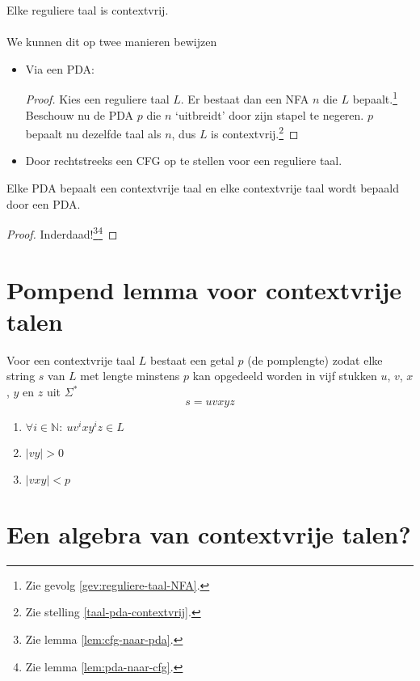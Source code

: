 \documentclass[main.tex]{subfiles}
\begin{document}
\begin{gev}
  Elke reguliere taal is contextvrij.\\\\
  We kunnen dit op twee manieren bewijzen
  \begin{itemize}
  \item Via een PDA:
    \begin{proof}
      Kies een reguliere taal $L$. Er bestaat dan een NFA $n$ die $L$ bepaalt.\footnote{Zie gevolg \ref{gev:reguliere-taal-NFA}.}
      Beschouw nu de PDA $p$ die $n$ `uitbreidt' door zijn stapel te negeren.
      $p$ bepaalt nu dezelfde taal als $n$, dus $L$ is contextvrij.\footnote{Zie stelling \ref{taal-pda-contextvrij}.}
    \end{proof}
  \item Door rechtstreeks een CFG op te stellen voor een reguliere taal.
  \end{itemize}
\end{gev}

\begin{st}
  Elke PDA bepaalt een contextvrije taal en elke contextvrije taal wordt bepaald door een PDA.
 
  \begin{proof}
    Inderdaad!\footnote{Zie lemma \ref{lem:cfg-naar-pda}.}\footnote{Zie lemma \ref{lem:pda-naar-cfg}.}
  \end{proof}
\end{st}

\section{Pompend lemma voor contextvrije talen}

\begin{st}
  Voor een contextvrije taal $L$ bestaat een getal $p$ (de pomplengte) zodat elke string $s$ van $L$ met lengte minstens $p$ kan opgedeeld worden in   vijf stukken $u$, $v$, $x$, $y$ en $z$ uit $\Sigma^{*}$
  \[ s = uvxyz \]
  \begin{enumerate}
    \item $\forall i \in \mathbb{N}:\ uv^{i}xy^{i}z \in L$
    \item $|vy| > 0$
    \item $|vxy| < p$
  \end{enumerate}
\end{st}

\section{Een algebra van contextvrije talen?}
\end{document}
